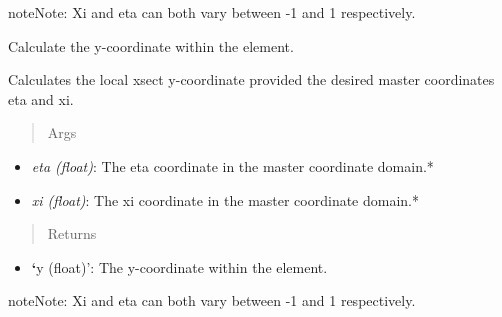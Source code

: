 \documentclass[letterpaper,10pt,english]{sphinxmanual}
\begin{document}
\begin{fulllineitems}
\begin{fulllineitems}
\begin{itemize}
\end{itemize}

\begin{notice}{note}{Note:}
Xi and eta can both vary between -1 and 1 respectively.
\end{notice}

\end{fulllineitems}


\begin{fulllineitems}
\label{structures:AeroComBAT.Structures.CQUADX.y}
Calculate the y-coordinate within the element.

Calculates the local xsect y-coordinate provided the desired master
coordinates eta and xi.
\begin{quote}\begin{description}
\item[{Args}] \leavevmode
\end{description}\end{quote}
\begin{itemize}
\item {} 
\emph{eta (float)}: The eta coordinate in the master coordinate domain.*

\item {} 
\emph{xi (float)}: The xi coordinate in the master coordinate domain.*

\end{itemize}
\begin{quote}\begin{description}
\item[{Returns}] \leavevmode
\end{description}\end{quote}
\begin{itemize}
\item {} 
{\color{red}\bfseries{}{}`}y (float)': The y-coordinate within the element.

\end{itemize}

\begin{notice}{note}{Note:}
Xi and eta can both vary between -1 and 1 respectively.
\end{notice}

\end{fulllineitems}


\end{fulllineitems}
\end{document}
